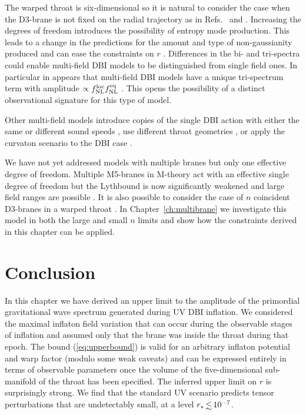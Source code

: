 The warped throat is six-dimensional so it is natural to consider the case when
the D3-brane is not fixed on the radial trajectory as in
Refs.~\cite{spinflation} and \cite{Huang:2007hh}. Increasing the degrees of
freedom introduces the possibility of entropy mode production. This leads to a
change in the predictions for the amount and type of non-gaussianity produced
and can ease the constraints on $r$ \cite{Arroja:2008yy, Langlois:2009ej,
Langlois:2008qf, Langlois:2008wt, Mizuno:2009mv, Mizuno:2009cv}. Differences in
the bi- and tri-spectra could enable multi-field DBI models to be distinguished
from single field ones. In particular in appears that multi-field DBI models
have a unique tri-spectrum term with amplitude $\propto f_{\mathrm{NL}}^\mathrm{loc}f_{\mathrm{NL}}^{\mathrm{eq}}$
\cite{RenauxPetel:2009sj}. This opens the possibility of a distinct
observational signature for this type of model.

Other multi-field models introduce copies of the single DBI action with either
the same or different sound speeds \cite{Cai:2008if, Cai:2009hw},  use
different throat geometries \cite{Gmeiner:2007uw},
or apply the curvaton scenario \cite{Lyth:2001nq} to the DBI case
\cite{Li:2008fm, Kobayashi:2009cm}.

We have not yet addressed models with multiple branes but only one effective
degree of freedom. Multiple M5-branes in M-theory act with an effective single
degree of freedom but the Lythbound is now significantly weakened and large
field ranges are possible \cite{Krause:2007jr}. It is also possible to consider
the case of $n$ coincident D3-branes in a warped throat \cite{thomasward, hltw,
Ward:2007gs}. In Chapter~\ref{ch:multibrane} we investigate this model in both
the large and small $n$ limits and show how the constraints derived in this
chapter can be applied.


% 
% 
% 
\section{Conclusion}
\label{sec:conclusion-dbi}

In this chapter we have derived an upper limit to
the amplitude of the primordial gravitational wave spectrum
generated during UV DBI inflation. We considered   
the maximal inflaton field variation   
that can occur during the observable stages of inflation and assumed  
only that the brane was inside the throat during that epoch. 
The bound (\ref{eq:upperbound}) is valid for an arbitrary inflaton potential and 
warp factor (modulo some weak caveats) and can be expressed 
entirely in terms of observable parameters once the volume of 
the five-dimensional sub-manifold of the throat has been specified. 
The inferred upper limit on $r$ is surprisingly strong. 
We find that the standard UV  
scenario predicts tensor perturbations that are undetectably small, 
at a level ${r_*} \, {\lsim} \, {10^{-7}}$. 

